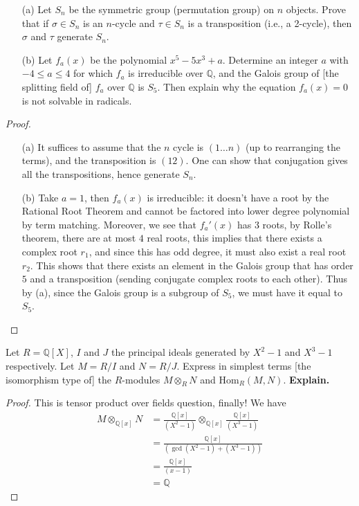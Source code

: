 \documentclass[openany]{book}
\newcommand{\Q}{\mathbb{Q}}
\begin{document}
\begin{prob}
    \begin{itemize}
        \item[(a)] Let \(S_n\) be the symmetric group (permutation group) on \(n\) objects. Prove that if \(\sigma \in S_n\) is an \(n\)-cycle and \(\tau \in S_n\) is a transposition (i.e., a 2-cycle), then \(\sigma\) and \(\tau\) generate \(S_n\).
        \item[(b)] Let \(f_a(x)\) be the polynomial \(x^5 - 5x^3 + a\). Determine an integer \(a\) with \(-4 \leq a \leq 4\) for which \(f_a\) is irreducible over \(\mathbb{Q}\), and the Galois group of [the splitting field of] \(f_a\) over \(\mathbb{Q}\) is \(S_5\). Then explain why the equation \(f_a(x) = 0\) is not solvable in radicals.
    \end{itemize}
\end{prob}
\begin{proof}
    \begin{itemize}
        \item[(a)] It suffices to assume that the $n$ cycle is $(1\dots n)$ (up to rearranging the terms), and the transposition is $(12)$. One can show that conjugation gives all the transpositions, hence generate $S_n$.
        \item[(b)] Take $a=1$, then $f_a(x)$ is irreducible: it doesn't have a root by the Rational Root Theorem and cannot be factored into lower degree polynomial by term matching. Moreover, we see that $f_a'(x)$ has $3$ roots, by Rolle's theorem, there are at most $4$ real roots, this implies that there exists a complex root $r_1$, and since this has odd degree, it must also exist a real root $r_2$. This shows that there exists an element in the Galois group that has order $5$ and a transposition (sending conjugate complex roots to each other). Thus by (a), since the Galois group is a subgroup of $S_5$, we must have it equal to $S_5$. 
    \end{itemize}
\end{proof}



\begin{prob}
    Let \(R = \mathbb{Q}[X]\), \(I\) and \(J\) the principal ideals generated by \(X^2 - 1\) and \(X^3 - 1\) respectively. Let \(M = R/I\) and \(N = R/J\). Express in simplest terms [the isomorphism type of] the \(R\)-modules \(M \otimes_R N\) and \(\text{Hom}_R(M, N)\). \textbf{Explain.}
\end{prob}
\begin{proof}
    This is tensor product over fields question, finally! We have 
    \begin{align*}
        M\otimes_{\Q[x]}N&=\frac{\Q[x]}{(X^2-1)}\otimes_{\Q[x]}\frac{\Q[x]}{(X^3-1)}\\
        &=\frac{\Q[x]}{\left(\gcd(X^2-1)+(X^3-1)\right)}\\
        &=\frac{\Q[x]}{(x-1)}\\
        &=\Q
    \end{align*}

\end{proof}
\end{document}
